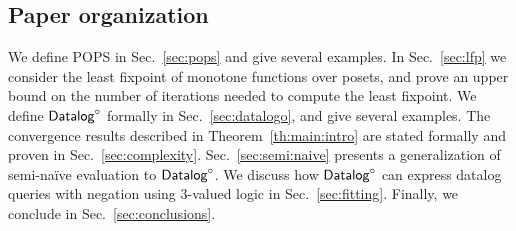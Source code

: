 \subsection{Paper organization}

We define POPS in Sec.~\ref{sec:pops} and give several examples.
In Sec.~\ref{sec:lfp} we consider the least fixpoint of monotone
functions over posets, and prove an upper bound on the number of
iterations needed to compute the least fixpoint.  We define $\text{\sf Datalog}^\circ$
formally in Sec.~\ref{sec:datalogo}, and give several examples.
The convergence results described in Theorem~\ref{th:main:intro} are
stated formally and proven in Sec.~\ref{sec:complexity}.
Sec.~\ref{sec:semi:naive} presents a generalization of semi-na\"ive
evaluation to $\text{\sf Datalog}^\circ$.  We discuss how $\text{\sf Datalog}^\circ$ can express datalog
queries with negation using 3-valued logic in
Sec.~\ref{sec:fitting}.  Finally, we conclude in
Sec.~\ref{sec:conclusions}.
